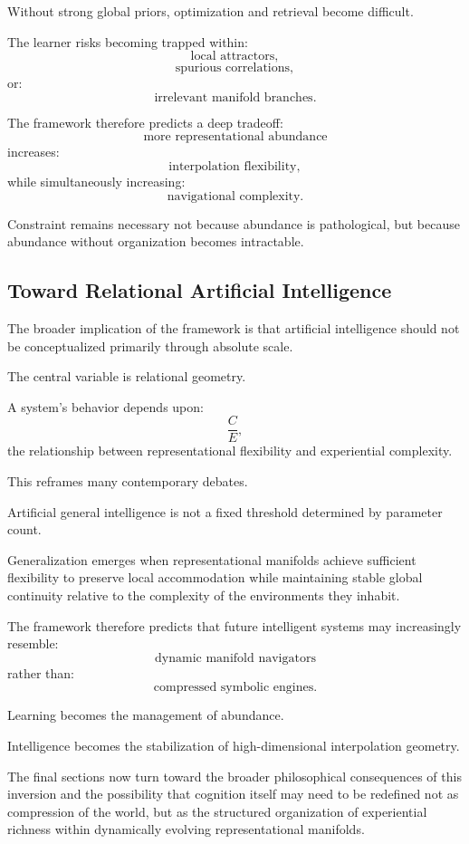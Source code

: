 \documentclass[12pt,a4paper]{article}
\begin{document}
Without strong global priors, optimization and retrieval become difficult.

The learner risks becoming trapped within:
\[
\text{local attractors},
\]
\[
\text{spurious correlations},
\]
or:
\[
\text{irrelevant manifold branches}.
\]

The framework therefore predicts a deep tradeoff:
\[
\text{more representational abundance}
\]
increases:
\[
\text{interpolation flexibility},
\]
while simultaneously increasing:
\[
\text{navigational complexity}.
\]

Constraint remains necessary not because abundance is pathological, but because abundance without organization becomes intractable.

\subsection{Toward Relational Artificial Intelligence}

The broader implication of the framework is that artificial intelligence should not be conceptualized primarily through absolute scale.

The central variable is relational geometry.

A system’s behavior depends upon:
\[
\frac{C}{E},
\]
the relationship between representational flexibility and experiential complexity.

This reframes many contemporary debates.

Artificial general intelligence is not a fixed threshold determined by parameter count.

Generalization emerges when representational manifolds achieve sufficient flexibility to preserve local accommodation while maintaining stable global continuity relative to the complexity of the environments they inhabit.

The framework therefore predicts that future intelligent systems may increasingly resemble:
\[
\text{dynamic manifold navigators}
\]
rather than:
\[
\text{compressed symbolic engines}.
\]

Learning becomes the management of abundance.

Intelligence becomes the stabilization of high-dimensional interpolation geometry.

The final sections now turn toward the broader philosophical consequences of this inversion and the possibility that cognition itself may need to be redefined not as compression of the world, but as the structured organization of experiential richness within dynamically evolving representational manifolds.
\end{document}
